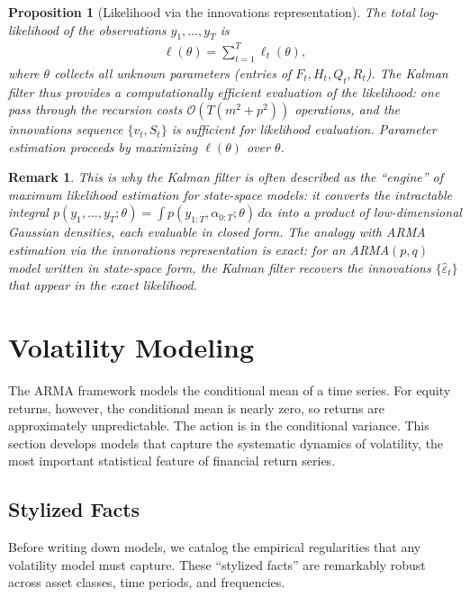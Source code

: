 \documentclass{report}
\theoremstyle{spacedplain}
\newtheorem{proposition}[theorem]{Proposition}
\theoremstyle{spaceddefinition}
\theoremstyle{spacedremark}
\newtheorem{remark}[theorem]{Remark}
\begin{document}
\begin{proposition}[Likelihood via the innovations representation]
The total log-likelihood of the observations $y_1, \ldots, y_T$ is
\begin{align}
    \ell(\theta) = \sum_{t=1}^T \ell_t(\theta),
\end{align}
where $\theta$ collects all unknown parameters (entries of $F_t, H_t, Q_t, R_t$). The Kalman filter thus provides a computationally efficient evaluation of the likelihood: one pass through the recursion costs $\mathcal{O}(T(m^2 +
p^2))$ operations, and the innovations sequence $\{v_t, S_t\}$ is sufficient for likelihood evaluation. Parameter estimation proceeds by maximizing $\ell(\theta)$ over $\theta$.
\end{proposition}
 
\begin{remark}
This is why the Kalman filter is often described as the ``engine'' of maximum likelihood estimation for state-space models: it converts the intractable integral $p(y_1,\ldots,y_T;\theta) = \int p(y_{1:T},\alpha_{0:T};\theta)\,d\alpha$ into a product of low-dimensional Gaussian densities, each evaluable in
closed form. The analogy with ARMA estimation via the innovations representation is exact: for an ARMA$(p,q)$ model written in state-space form, the Kalman filter recovers the innovations $\{\hat{\varepsilon}_t\}$ that appear in the
exact likelihood.
\end{remark}
 

\section{Volatility Modeling}

The ARMA framework models the conditional mean of a time series. For equity returns, however, the conditional mean is nearly zero, so returns are approximately unpredictable. The action is in the conditional variance. This section develops models that capture the systematic dynamics of volatility, the most important statistical feature of financial return series.

\subsection{Stylized Facts}

Before writing down models, we catalog the empirical regularities that any volatility model must capture. These ``stylized facts'' are remarkably robust across asset classes, time periods, and frequencies.
\end{document}
